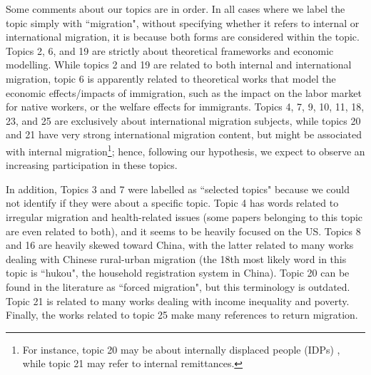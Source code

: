 Some comments about our topics are in order. In all cases where we label the topic simply with ``migration", without specifying whether it refers to internal or international migration, it is because both forms are considered within the topic. Topics 2, 6, and 19 are strictly about theoretical frameworks and economic modelling. While topics 2 and 19 are related to both internal and international migration, topic 6 is apparently related to theoretical works that model the economic effects/impacts of immigration, such as the impact on the labor market for native workers, or the welfare effects for immigrants. Topics 4, 7, 9, 10, 11, 18, 23, and 25 are exclusively about international migration subjects, while topics 20 and 21 have very strong international migration content, but might be associated with internal migration\footnote{For instance, topic 20 may be about internally displaced people (IDPs) \citep{talleraas_humanitarian_2022}, while topic 21 may refer to internal remittances.}; hence, following our hypothesis, we expect to observe an increasing participation in these topics. 

\begin{landscape}

\end{landscape}

\begin{landscape}

\end{landscape}

In addition, Topics 3 and 7 were labelled as ``selected topics" because we could not identify if they were about a specific topic. Topic 4 has words related to irregular migration and health-related issues (some papers belonging to this topic are even related to both), and it seems to be heavily focused on the US. Topics 8 and 16 are heavily skewed toward China, with the latter related to many works dealing with Chinese rural-urban migration (the 18th most likely word in this topic is ``hukou", the household registration system in China). Topic 20 can be found in the literature as ``forced migration", but this terminology is outdated. Topic 21 is related to many works dealing with income inequality and poverty. Finally, the works related to topic 25 make many references to return migration.

